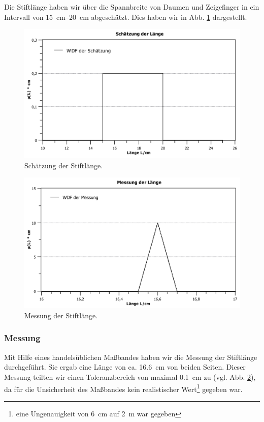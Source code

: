 \documentclass[11pt,a4paper,titlepage, ngerman]{article}
\begin{document}
				Die Stiftlänge haben wir über die Spannbreite von Daumen und Zeigefinger in ein Intervall von \SIrange{15}{20}{\cm} abgeschätzt. Dies haben wir in Abb. \ref{fig:laenge} dargestellt.
				
				\begin{figure}						
					\centering
					\includegraphics[scale=0.8]{Laengenschaetzung.pdf}				
					\caption{Schätzung der Stiftlänge.}
					\label{fig:laenge}
				\end{figure}
				\begin{figure}						
					\centering
					\includegraphics[scale=0.8]{Laengenmessung.pdf}				
					\caption{Messung der Stiftlänge.}
					\label{fig:laenge2}
				\end{figure}
			
			\subsubsection{Messung}
				\label{2.2.2}
				
				Mit Hilfe eines handelsüblichen Maßbandes haben wir die Messung der Stiftlänge durchgeführt. 
				Sie ergab eine Länge von ca. \SI{16,6}{\cm} von beiden Seiten. Dieser Messung teilten wir einen Toleranzbereich von maximal \SI{0,1}{\cm} zu (vgl. Abb. \ref{fig:laenge2}), da für die Unsicherheit des Maßbandes kein realistischer Wert\footnote{eine Ungenauigkeit von \SI{6}{\cm} auf \SI{2}{\m} war gegeben} gegeben war.
			
\end{document}
